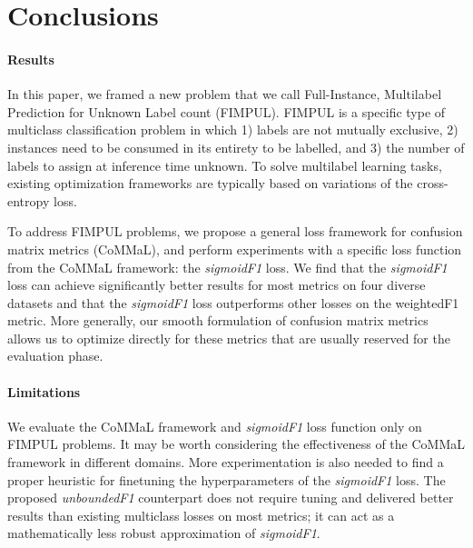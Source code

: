 
\section{Conclusions}
\label{sec:orged3d8a1}


\paragraph{Results}
In this paper, we framed a new problem that we call Full-Instance, Multilabel Prediction for Unknown Label count (FIMPUL). FIMPUL is a specific type of multiclass classification problem in which 1) labels are not mutually exclusive, 2) instances need to be consumed in its entirety to be labelled,
and 3) the number of labels to assign at inference time unknown.
To solve multilabel learning tasks, existing optimization frameworks are typically based on variations of the cross-entropy loss.

To address FIMPUL problems, we propose a general loss framework for confusion matrix metrics (CoMMaL), and perform experiments with a specific loss function from the CoMMaL framework: the \emph{sigmoidF1} loss. We find that the \emph{sigmoidF1} loss can achieve significantly better results for most metrics on four diverse datasets and that the \emph{sigmoidF1} loss outperforms other losses on the weightedF1 metric.
More generally, our smooth formulation of confusion matrix metrics allows us to optimize directly for these metrics that are usually reserved for the evaluation phase.

\paragraph{Limitations}
We evaluate the CoMMaL framework and \emph{sigmoidF1} loss function only on FIMPUL problems. It may be worth considering the effectiveness of the CoMMaL framework in different domains. More experimentation is also needed to find a proper heuristic for finetuning the hyperparameters of the \emph{sigmoidF1} loss. The proposed \emph{unboundedF1} counterpart does not require tuning and delivered better results than existing multiclass losses on most metrics; it can act as a mathematically less robust approximation of \emph{sigmoidF1}.

